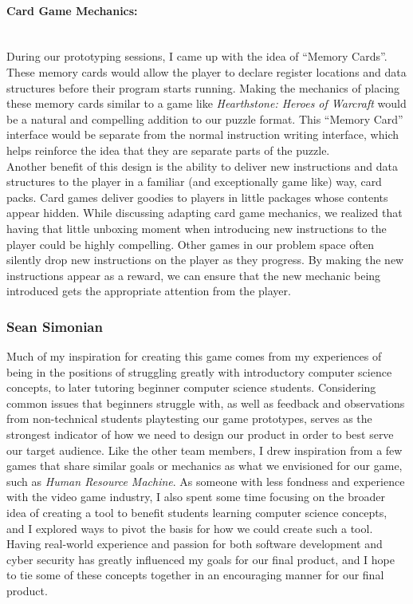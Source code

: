 \paragraph{Card Game Mechanics:} ~\\
During our prototyping sessions, I came up with the idea of “Memory Cards”. These memory cards would allow the player to declare register locations and data structures before their program starts running. Making the mechanics of placing these memory cards similar to a game like \textit{Hearthstone: Heroes of Warcraft} would be a natural and compelling addition to our puzzle format. This “Memory Card” interface would be separate from the normal instruction writing interface, which helps reinforce the idea that they are separate parts of the puzzle. \\

Another benefit of this design is the ability to deliver new instructions and data structures to the player in a familiar (and exceptionally game like) way, card packs. Card games deliver goodies to players in little packages whose contents appear hidden. While discussing adapting card game mechanics, we realized that having that little unboxing moment when introducing new instructions to the player could be highly compelling. Other games in our problem space often silently drop new instructions on the player as they progress. By making the new instructions appear as a reward, we can ensure that the new mechanic being introduced gets the appropriate attention from the player. \\

\subsubsection{Sean Simonian}
Much of my inspiration for creating this game comes from my experiences of being in the positions of struggling greatly with introductory computer science concepts, to later tutoring beginner computer science students. Considering common issues that beginners struggle with, as well as feedback and observations from non-technical students playtesting our game prototypes, serves as the strongest indicator of how we need to design our product in order to best serve our target audience. Like the other team members, I drew inspiration from a few games that share similar goals or mechanics as what we envisioned for our game, such as \textit{Human Resource Machine}. As someone with less fondness and experience with the video game industry, I also spent some time focusing on the broader idea of creating a tool to benefit students learning computer science concepts, and I explored ways to pivot the basis for how we could create such a tool. Having real-world experience and passion for both software development and cyber security has greatly influenced my goals for our final product, and I hope to tie some of these concepts together in an encouraging manner for our final product.\\

